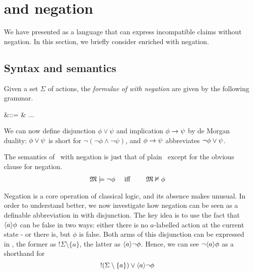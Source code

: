 \section{\Cathoristic{} and negation}\label{ELAndNegation}

\NI We have presented \cathoristic{} as a language that can express
incompatible claims without negation.  In this section, we briefly
consider \cathoristic{} enriched with negation.

\subsection{Syntax and semantics}

\begin{definition}
Given a set $\Sigma$ of actions, the \emph{formulae of \cathoristic{}
  with negation} are given by the following grammar.
\begin{GRAMMAR}
  \phi 
     &\quad ::= \quad & 
   ... \fOr \neg \phi
\end{GRAMMAR}

\NI We can now define disjunction $\phi \lor \psi$ and implication
$\phi \rightarrow \psi$ by de Morgan duality: $\phi \lor \psi$ is short
for $\neg (\neg \phi \land \neg \psi )$, and $\phi \rightarrow \psi$  abbreviates
$\neg\phi \lor \psi$.
\end{definition}

The semantics of \cathoristic\ with negation is just that of plain
\cathoristic\, except for the obvious clause for negation.
\begin{eqnarray*}
\frak{M} \models \neg \phi &\quad\mbox{ iff }\quad& \frak{M} \nvDash \phi  
\end{eqnarray*}

\NI Negation is a core operation of classical logic, and its absence makes
\cathoristic{} unusual. In order to understand \cathoristic{} better, we
now investigate how negation can be seen as a definable abbreviation
in \cathoristic{} with disjunction. The key idea is to use the fact that $\langle a \rangle \phi$
can be false in two ways: either there is no $a$-labelled action at
the current state - or there is, but $\phi$ is false. Both arms of
this disjunction can be expressed in \cathoristic{}, the former as
$!\Sigma \setminus \{a\}$, the latter as $\langle a \rangle \neg \phi$.
 Hence, we can see $\neg \langle a \rangle \phi$ as a shorthand for 
\[
   !(\Sigma \setminus \{a\}) \lor \langle a \rangle \neg \phi
\]


